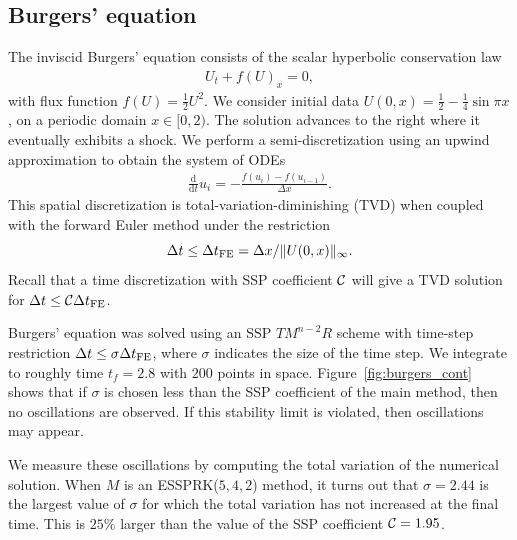 \subsection{Burgers' equation}\label{subsubsec:burgers}
The inviscid Burgers' equation consists of the scalar hyperbolic conservation law
\begin{align}\label{eq:HCL}
    U_{t} + f(U)_{x} = 0,
\end{align}
with flux function $f(U) = \frac{1}{2}U^{2}$. 
We consider initial data
$U(0,x)  = \frac{1}{2} - \frac{1}{4}\sin{\pi x}$,
on a periodic domain $x \in [0,2)$.
The solution advances to the right where it eventually exhibits a shock. 
We perform a semi-discretization
using an upwind approximation to obtain the system of ODEs
\begin{align*}\label{eq:burgers_flux}
	\frac{\textrm{d}}{\textrm{d} t} u_i = -\frac{f(u_{i}) - f(u_{i-1})}{\Delta x}.
\end{align*}
This spatial discretization is total-variation-diminishing (TVD) when
coupled with the forward Euler method under the restriction
\cite{Laney:1998}  %
$$\Delta t \leq {\Delta t}_{\text{FE}} = \Delta x / \|U(0,x)\|_{\infty}.$$
Recall that a time discretization with SSP
coefficient $\mathcal{C}$ will give a TVD solution for $\Delta t \leq
\mathcal{C} {\Delta t}_{\text{FE}}$.

Burgers' equation was solved using an SSP $TM^{n-2}R$ scheme with time-step
restriction $\Delta t \leq \sigma{\Delta t}_{\text{FE}}$, where $\sigma$ indicates the size 
of the time step. 
We integrate to roughly time $t_{f} = 2.8$ with $200$ points in space.
Figure~\ref{fig:burgers_cont} shows that if $\sigma$ is chosen less than the SSP
coefficient of the main method, then no oscillations are observed. 
If this stability limit is violated, then oscillations may appear.

We measure these oscillations by computing the total variation of the 
numerical solution.
When $M$ is an ESSPRK($5,4,2$) method,
it turns out that $\sigma = 2.44$ is the largest value of $\sigma$
for which the total variation has not increased at the final time.
This is $25\%$ larger than the value of the SSP coefficient $\mathcal{C} = 1.95$.

